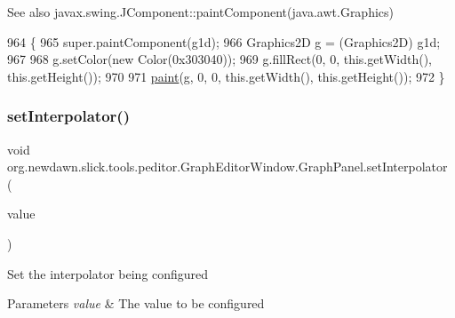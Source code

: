\begin{DoxySeeAlso}{See also}
javax.\+swing.\+J\+Component\+::paint\+Component(java.\+awt.\+Graphics) 
\end{DoxySeeAlso}

\begin{DoxyCode}
964                                                  \{
965             super.paintComponent(g1d);
966             Graphics2D g = (Graphics2D) g1d;
967 
968             g.setColor(\textcolor{keyword}{new} Color(0x303040));
969             g.fillRect(0, 0, this.getWidth(), this.getHeight());
970 
971             \mbox{\hyperlink{classorg_1_1newdawn_1_1slick_1_1tools_1_1peditor_1_1_graph_editor_window_1_1_graph_panel_a3eae15c7773d95fac15406bcb20e97c0}{paint}}(g, 0, 0, this.getWidth(), this.getHeight());
972         \}
\end{DoxyCode}
\mbox{\label{classorg_1_1newdawn_1_1slick_1_1tools_1_1peditor_1_1_graph_editor_window_1_1_graph_panel_a290757906b8a1372930a6d0f29f886da}} 
\subsubsection{\texorpdfstring{set\+Interpolator()}{setInterpolator()}}
{\footnotesize\ttfamily void org.\+newdawn.\+slick.\+tools.\+peditor.\+Graph\+Editor\+Window.\+Graph\+Panel.\+set\+Interpolator (\begin{DoxyParamCaption}\item[{\mbox{\hyperlink{classorg_1_1newdawn_1_1slick_1_1particles_1_1_configurable_emitter_1_1_linear_interpolator}{Linear\+Interpolator}}}]{value }\end{DoxyParamCaption})\hspace{0.3cm}{\ttfamily [inline]}}

Set the interpolator being configured


\begin{DoxyParams}{Parameters}
{\em value} & The value to be configured \\
\hline
\end{DoxyParams}

